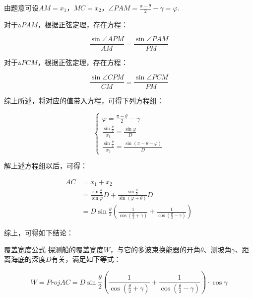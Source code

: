 由题意可设$AM=x_1$，$MC=x_2$，$\angle PAM = \frac{\pi - \theta}{2} - \gamma = \varphi $.

对于$\vartriangle PAM$，根据正弦定理，存在方程：

\begin{equation*}
    \frac{\sin\angle APM}{AM} = \frac{\sin\angle PAM}{PM}
\end{equation*}

对于$\vartriangle PCM$，根据正弦定理，存在方程：

\begin{equation*}
    \frac{\sin\angle CPM}{CM} = \frac{\sin\angle PCM}{PM}
\end{equation*}

综上所述，将对应的值带入方程，可得下列方程组：

\begin{equation}
    \begin{cases}
        \varphi = \frac{\pi - \theta}{2} - \gamma \\
        \frac{\sin \frac{\theta}{2}}{x_1} = \frac{\sin\varphi}{D} \\
        \frac{\sin \frac{\theta}{2}}{x_2} = \frac{\sin(\pi-\theta-\varphi)}{D}
    \end{cases}
\end{equation}

解上述方程组以后，可得：

\begin{equation}
\begin{aligned}
    AC &= x_1 + x_2 \\
       &= \frac{\sin\frac{\theta}{2}}{\sin\varphi}D + \frac{\sin\frac{\theta}{2}}{\sin(\varphi + \theta)}D \\
       &= D\sin\frac{\theta}{2}\left(\frac{1}{\cos(\frac{\theta}{2}+\gamma)} + \frac{1}{\cos(\frac{\theta}{2}-\gamma)}\right)
\end{aligned}
\end{equation}

综上，可得如下结论：

\begin{mcmTheorem}{覆盖宽度公式}
    探测船的覆盖宽度$W$，与它的多波束换能器的开角$\theta$、测坡角$\gamma$、距离海底的深度$D$有关，满足如下等式：

    \begin{equation}
        W = 
        Proj AC = 
        D\sin\frac{\theta}{2}\left(\frac{1}{\cos(\frac{\theta}{2}+\gamma)} + \frac{1}{\cos(\frac{\theta}{2}-\gamma)}\right) \cdot \cos \gamma
    \end{equation}
\end{mcmTheorem}

